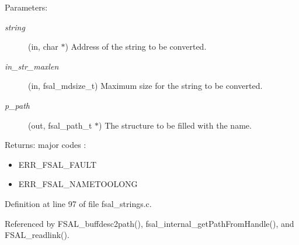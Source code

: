 \begin{Desc}
\item[Parameters:]
\begin{description}
\item[{\em string}](in, char $\ast$) Address of the string to be converted. \item[{\em in\_\-str\_\-maxlen}](in, fsal\_\-mdsize\_\-t) Maximum size for the string to be converted. \item[{\em p\_\-path}](out, fsal\_\-path\_\-t $\ast$) The structure to be filled with the name.\end{description}
\end{Desc}
\begin{Desc}
\item[Returns:]major codes :\begin{itemize}
\item ERR\_\-FSAL\_\-FAULT\item ERR\_\-FSAL\_\-NAMETOOLONG \end{itemize}
\end{Desc}


Definition at line 97 of file fsal\_\-strings.c.

Referenced by FSAL\_\-buffdesc2path(), fsal\_\-internal\_\-get\-Path\-From\-Handle(), and FSAL\_\-readlink().